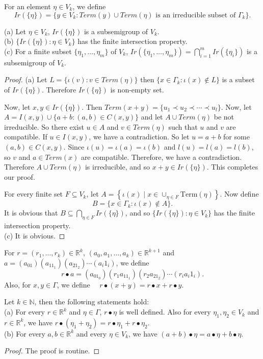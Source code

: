 \documentclass[twoside,11pt]{article}
\begin{document}
\begin{definition}
	For an element $\eta\in V_k$, we define 
	\[
	Ir(\{\eta\})=\{y\in V_k:Term(y)\cup Term(\eta)\mbox{ is an irreducible subset of }\Gamma_k\}.
	\] 
\end{definition}
\begin{lemma}{\label{366}}
	(a) Let $\eta\in V_k$, $Ir(\{\eta\})$ is a subsemigroup of $V_k$.\\ 
	(b) $\{Ir(\{\eta\}):\eta\in V_k\}$ has the finite intersection property.\\
	(c) For a finite subset $\{\eta_1,\ldots,\eta_m\}$ of $V_k$, $Ir(\{\eta_1,\ldots,\eta_m\})=\bigcap_{i=1}^mIr(\{\eta_i\})$ is a subsemigroup of $V_k$.
\end{lemma}
\begin{proof}
	(a) Let $L=\{\iota(v):v\in Term(\eta)\}$ then $\{x\in\Gamma_k:\iota(x)\notin L\}$ is a subset of $Ir(\{\eta\})$. Therefore $Ir(\{\eta\})$ is non-empty set. 
	
	Now, let $x,y\in Ir(\{\eta\})$. Then $Term(x+y)=\{u_1\prec u_2\prec\cdots\prec u_l\}$. Now, let $A=I(x,y)\cup \{a+b:(a,b)\in C(x,y)\}$ and let $A\cup Term(\eta)$ be not irreducible. So there exist $u\in A$ and $v\in Term(\eta)$ such that $u$ and $v$ are compatible. If $u\in I(x,y)$, we have a contradiction. So let $u=a+b$ for some $(a,b)\in C(x,y)$. Since $\iota(u)=\iota(a)=\iota(b)$ and $l(u)=l(a)=l(b)$, so $v$ and $a\in Term(x)$ are compatible. Therefore, we have a contradiction. Therefore $A\cup Term(\eta)$ is irreducible, and so $x+y\in Ir(\{\eta\})$. This completes our proof.\\
	\item[(b)] For every finite set $F \subseteq V_k$, let
	$A = \left\{ \iota(x) \mid x \in \cup_{\eta \in F} \mathrm{Term}(\eta) \right\}.$ Now define 
	\[
	B=\{x\in\Gamma_k:\iota(x)\notin A\}.
	\] 
	It is obvious that $B\subseteq \bigcap_{\eta\in F}Ir(\{\eta\})$, and so $\{Ir(\{\eta\}):\eta\in V_k\}$ has the finite intersection property. \\
	(c) It is obvious.
\end{proof}
\begin{definition}{\label{3.6}}
	For $ r = ( r_1, \ldots, r_k)\in \mathbb{R}^{k} $, $(a_0,a_1,\ldots,a_k) \in \mathbb{R}^{k+1}$ and $a=(a_01)(a_11_1)(a_21_2)\cdots(a_i1_i)$, we define 
	\[
	r\bullet a=(a_01_0)(r_1a_11_1)(r_2a_21_2)\cdots(r_ia_i1_i). 
	\]
	Also, for $x,y\in \Gamma$, we define $\quad r \bullet (x+y) =r\bullet x+r\bullet y$.
\end{definition}
\begin{lemma}
	Let $k\in \mathbb{N}$, then the following statements hold:\\
	(a) For every $r\in \mathbb{R}^k$ and $\eta\in \Gamma$, $r\bullet \eta$ is well defined. Also for every $\eta_1,\eta_2\in V_k$ and $r\in \mathbb{R}^k$, we have $r\bullet(\eta_1+\eta_2)=r\bullet\eta_1+r\bullet\eta_2$.\\
	(b) For every  $a,b\in \mathbb{R}^k$ and every $\eta\in V_k$, we have $(a+b)\bullet \eta=a\bullet\eta+b\bullet\eta$.
\end{lemma}
\begin{proof}
	The proof is routine.
\end{proof}
\end{document}
